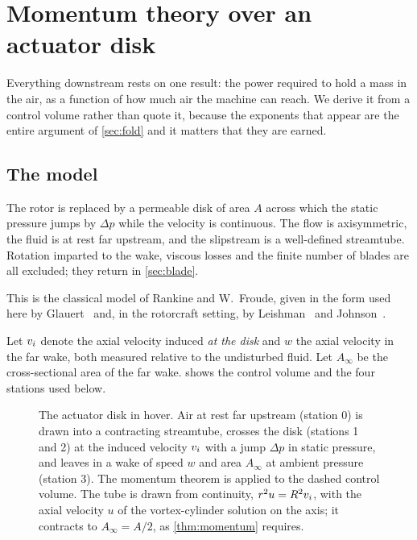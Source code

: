 ﻿\section{Momentum theory over an actuator disk}
\label{sec:momentum}

Everything downstream rests on one result: the power required to hold a mass in
the air, as a function of how much air the machine can reach. We derive it from
a control volume rather than quote it, because the exponents that appear are
the entire argument of \cref{sec:fold} and it matters that they are earned.

\subsection{The model}

\begin{model}
\label{mod:disk}
The rotor is replaced by a permeable disk of area $A$ across which the static
pressure jumps by $\Delta p$ while the velocity is continuous. The flow is
axisymmetric, the fluid is at rest far upstream, and the slipstream is a
well-defined streamtube. Rotation imparted to the wake, viscous losses and the
finite number of blades are all excluded; they return in \cref{sec:blade}.
\end{model}

This is the classical model of Rankine and W.~Froude, given in the form used
here by Glauert~\cite{glauert1935} and, in the rotorcraft setting, by
Leishman~\cite[Ch.~2]{leishman2006} and Johnson~\cite[Ch.~2]{johnson1980}.

Let $v_i$ denote the axial velocity induced \emph{at the disk} and $w$ the
axial velocity in the far wake, both measured relative to the undisturbed
fluid. Let $A_\infty$ be the cross-sectional area of the far wake.
 shows the control volume and the four stations used
below.

\begin{figure}[tbp]
\centering

\caption{The actuator disk in hover. Air at rest far upstream (station 0) is
drawn into a contracting streamtube, crosses the disk (stations 1 and 2) at the
induced velocity $v_i$ with a jump $\Delta p$ in static pressure, and leaves
in a wake of speed $w$ and area $A_\infty$ at ambient pressure (station 3). The
momentum theorem is applied to the dashed control volume. The tube is drawn
from continuity, $r^2u = R^2v_i$, with the axial velocity $u$ of the
vortex-cylinder solution on the axis; it contracts to $A_\infty = A/2$, as
\cref{thm:momentum} requires.}
\label{fig:streamtube}
\end{figure}

